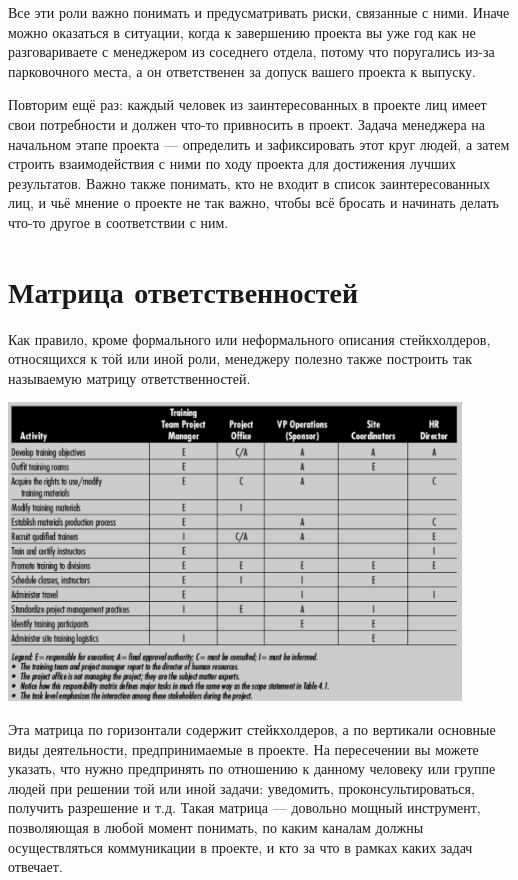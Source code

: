 \documentclass{../../text-style}
\begin{document}
Все эти роли важно понимать и предусматривать риски, связанные с ними. Иначе можно оказаться в ситуации, когда к завершению проекта вы уже год как не разговариваете с менеджером из соседнего отдела, потому что поругались из-за парковочного места, а он ответственен за допуск вашего проекта к выпуску.

Повторим ещё раз: каждый человек из заинтересованных в проекте лиц имеет свои потребности и должен что-то привносить в проект. Задача менеджера на начальном этапе проекта --- определить и зафиксировать этот круг людей, а затем строить взаимодействия с ними по ходу проекта для достижения лучших результатов. Важно также понимать, кто не входит в список заинтересованных лиц, и чьё мнение о проекте не так важно, чтобы всё бросать и начинать делать что-то другое в соответствии с ним.

\section{Матрица ответственностей}

Как правило, кроме формального или неформального описания стейкхолдеров, относящихся к той или иной роли, менеджеру полезно также построить так называемую матрицу ответственностей.

\begin{center}
    \includegraphics[width=0.9\textwidth]{stakeholders.png}
\end{center}

Эта матрица по горизонтали содержит стейкхолдеров, а по вертикали основные виды деятельности, предпринимаемые в проекте. На пересечении вы можете указать, что нужно предпринять по отношению к данному человеку или группе людей при решении той или иной задачи: уведомить, проконсультироваться, получить разрешение и т.д. Такая матрица --- довольно мощный инструмент, позволяющая в любой момент понимать, по каким каналам должны осуществляться коммуникации в проекте, и кто за что в рамках каких задач отвечает.
\end{document}
